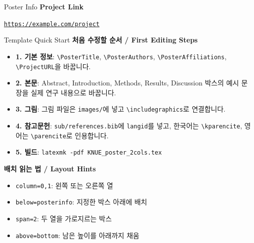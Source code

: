 \documentclass[a0paper,portrait]{KNUE_baposter}
\newcommand{\ProjectURL}{https://example.com/project}
\begin{document}
\begin{poster}
\begin{posterbox}[name=posterinfo,column=1,below=abstract]{Poster Info}
\vspace{0.6em}
\footnotesize
\textbf{Project Link}

\scriptsize
\href{\ProjectURL}{\nolinkurl{\ProjectURL}}
\end{posterbox}

%
\begin{posterbox}[name=boxlayoutguide,column=1,below=posterinfo]{Template Quick Start}
\tiny
\textbf{처음 수정할 순서 / First Editing Steps}

\begin{itemize}
\item \textbf{1. 기본 정보}: \texttt{\textbackslash PosterTitle}, \texttt{\textbackslash PosterAuthors}, \texttt{\textbackslash PosterAffiliations}, \texttt{\textbackslash ProjectURL}을 바꿉니다.
\item \textbf{2. 본문}: Abstract, Introduction, Methods, Results, Discussion 박스의 예시 문장을 실제 연구 내용으로 바꿉니다.
\item \textbf{3. 그림}: 그림 파일은 \texttt{images/}에 넣고 \texttt{\textbackslash includegraphics}로 연결합니다.
\item \textbf{4. 참고문헌}: \texttt{sub/references.bib}에 \texttt{langid}를 넣고, 한국어는 \texttt{\textbackslash kparencite}, 영어는 \texttt{\textbackslash parencite}로 인용합니다.
\item \textbf{5. 빌드}: \texttt{latexmk -pdf KNUE\_poster\_2cols.tex}
\end{itemize}

\vspace{0.25em}
\textbf{배치 읽는 법 / Layout Hints}

\begin{itemize}
\item \texttt{column=0,1}: 왼쪽 또는 오른쪽 열
\item \texttt{below=posterinfo}: 지정한 박스 아래에 배치
\item \texttt{span=2}: 두 열을 가로지르는 박스
\item \texttt{above=bottom}: 남은 높이를 아래까지 채움
\end{itemize}


\end{posterbox}
\end{poster}
\end{document}
